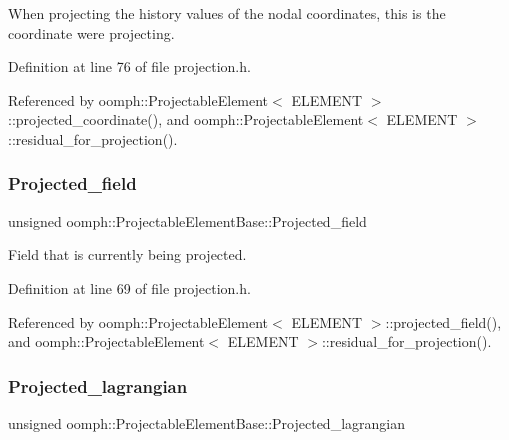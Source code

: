 When projecting the history values of the nodal coordinates, this is the coordinate we\textquotesingle{}re projecting. 



Definition at line 76 of file projection.\+h.



Referenced by oomph\+::\+Projectable\+Element$<$ E\+L\+E\+M\+E\+N\+T $>$\+::projected\+\_\+coordinate(), and oomph\+::\+Projectable\+Element$<$ E\+L\+E\+M\+E\+N\+T $>$\+::residual\+\_\+for\+\_\+projection().

\mbox{\label{classoomph_1_1ProjectableElementBase_aa71079c0f1075ac390708063fd7d2731}} 
\subsubsection{\texorpdfstring{Projected\+\_\+field}{Projected\_field}}
{\footnotesize\ttfamily unsigned oomph\+::\+Projectable\+Element\+Base\+::\+Projected\+\_\+field\hspace{0.3cm}{\ttfamily [protected]}}



Field that is currently being projected. 



Definition at line 69 of file projection.\+h.



Referenced by oomph\+::\+Projectable\+Element$<$ E\+L\+E\+M\+E\+N\+T $>$\+::projected\+\_\+field(), and oomph\+::\+Projectable\+Element$<$ E\+L\+E\+M\+E\+N\+T $>$\+::residual\+\_\+for\+\_\+projection().

\mbox{\label{classoomph_1_1ProjectableElementBase_a1034f9a066d1e4116f5b6acf5e5a279c}} 
\subsubsection{\texorpdfstring{Projected\+\_\+lagrangian}{Projected\_lagrangian}}
{\footnotesize\ttfamily unsigned oomph\+::\+Projectable\+Element\+Base\+::\+Projected\+\_\+lagrangian\hspace{0.3cm}{\ttfamily [protected]}}



